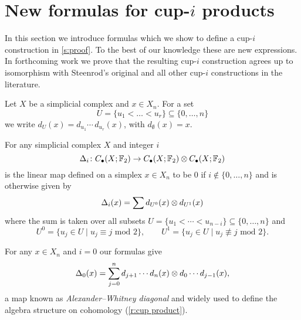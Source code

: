 
\section{New formulas for cup-\texorpdfstring{$i$}{i} products} \label{s:formulas}

In this section we introduce formulas which we show to define a cup-$i$ construction in \cref{s:proof}.
To the best of our knowledge these are new expressions.
In forthcoming work \cite{medina2018axiomatic} we prove that the resulting cup-$i$ construction agrees up to isomorphism with Steenrod's original and all other cup-$i$ constructions in the literature.

\begin{notation}
	Let $X$ be a simplicial complex and $x \in X_n$.
	For a set
	\begin{equation*}
	U = \{u_1 < \dots < u_r\} \subseteq \{0, \dots, n\}
	\end{equation*}
	we write $d_U(x) = d_{u_1}\! \dotsm \, d_{u_r}(x)$, with $d_{\emptyset}(x) = x$.
\end{notation}

\begin{definition} \label{d:cup-i coproducts}
	For any simplicial complex $X$ and integer $i$
	\begin{equation*}
	\Delta_i \colon C_\bullet(X; {\mathbb{F}_2}) \to C_\bullet(X; {\mathbb{F}_2}) \otimes C_\bullet(X; {\mathbb{F}_2})
	\end{equation*}
	is the linear map defined on a simplex $x \in X_n$ to be $0$ if $i \not\in \{0, \dots, n\}$ and is otherwise given by
	\begin{equation} \label{e:new formulas}
	\Delta_i(x) = \sum d_{U^0}(x) \otimes d_{U^1}(x)
	\end{equation}
	where the sum is taken over all subsets $U = \{u_1 < \cdots < u_{n-i}\} \subseteq \{0, \dots, n\}$ and
	\begin{equation} \label{e:partition subsets}
	U^0 = \{u_j \in U\mid u_j \equiv j \text{ mod } 2\}, \qquad
	U^1 = \{u_j \in U\mid u_j \not\equiv j \text{ mod } 2\}.
	\end{equation}
\end{definition}

\begin{example} \label{ex:alexander-whitney diagonal}
	For any $x \in X_n$ and $i = 0$ our formulas give
	\begin{equation*}
	\Delta_0(x) = \sum_{j=0}^n d_{j+1} \cdots d_{n}(x) \otimes d_{0} \cdots d_{j-1}(x),
	\end{equation*}
	a map known as \textit{Alexander--Whitney diagonal} and widely used to define the algebra structure on cohomology (\cref{r:cup product}).
\end{example}

